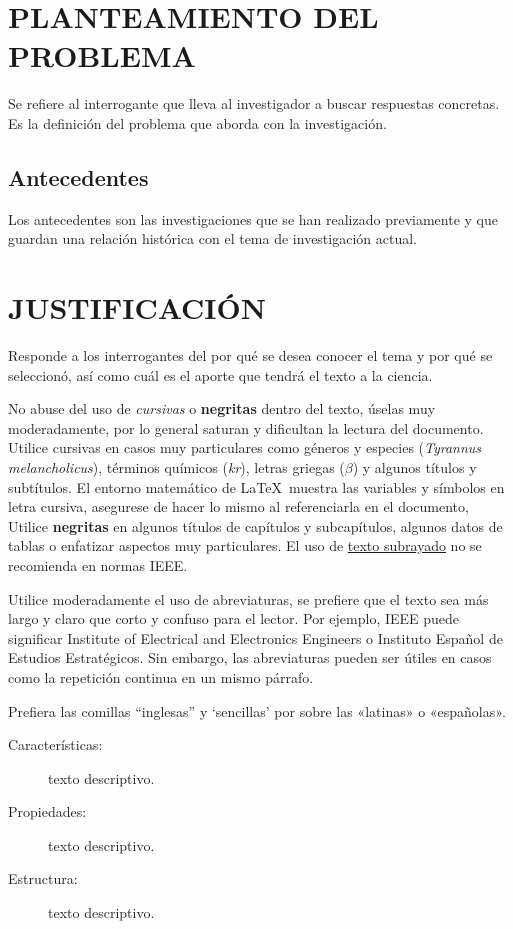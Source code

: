 \section{PLANTEAMIENTO DEL PROBLEMA}


Se refiere al interrogante que lleva al investigador a buscar respuestas concretas. Es la definición del problema que aborda con la investigación. 


\subsection{Antecedentes}
Los antecedentes son las investigaciones que se han realizado previamente y que guardan una relación histórica con el tema de investigación actual. 


\newpage


\section{JUSTIFICACIÓN}


Responde a los interrogantes del por qué se desea conocer el tema y por qué se seleccionó, así como cuál es el aporte que tendrá el texto a la ciencia. 

No abuse del uso de \textit{cursivas} o \textbf{negritas} dentro del texto, úselas muy moderadamente, por lo general saturan y dificultan la lectura del documento. Utilice cursivas en casos muy particulares como géneros y especies (\textit{Tyrannus melancholicus}), términos químicos (\textit{kr}), letras griegas ($\beta$) y algunos títulos y subtítulos. El entorno matemático de \LaTeX \ muestra las variables y símbolos en letra cursiva, asegurese de hacer lo mismo al referenciarla en el documento, Utilice \textbf{negritas} en algunos títulos de capítulos y subcapítulos, algunos datos de tablas o enfatizar aspectos muy particulares. El uso de \underline{texto subrayado} no se recomienda en normas IEEE.

Utilice moderadamente el uso de abreviaturas, se prefiere que el texto sea más largo y claro que corto y confuso para el lector. Por ejemplo, IEEE puede significar Institute of Electrical and Electronics Engineers o Instituto Español de Estudios Estratégicos. Sin embargo, las abreviaturas pueden ser útiles en casos como la repetición continua en un mismo párrafo.

Prefiera las comillas “inglesas” y ‘sencillas’ por sobre las «latinas» o «españolas».

\begin{description}
    \item[Características:] texto descriptivo.
    \item[Propiedades:] texto descriptivo.
    \item[Estructura:] texto descriptivo.
\end{description}
